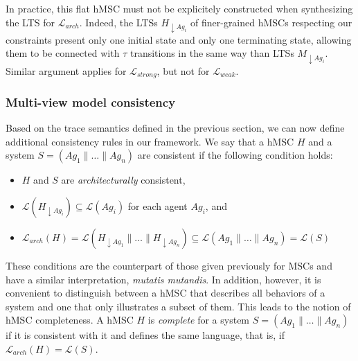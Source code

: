 In practice, this flat hMSC must not be explicitely constructed when synthesizing the LTS for $\mathcal{L}_{arch}$. Indeed, the LTSs $H_{\downarrow Ag_i}$ of finer-grained hMSCs respecting our constraints present only one initial state and only one terminating state, allowing them to be connected with $\tau$ transitions in the same way than LTSs $M_{\downarrow Ag_i}$. Similar argument applies for $\mathcal{L}_{strong}$, but not for $\mathcal{L}_{weak}$.

\subsubsection*{Multi-view model consistency}
 
Based on the trace semantics defined in the previous section, we can now define additional consistency rules in our framework. We say that a hMSC $H$ and a system $S = (Ag_1 \parallel \ldots \parallel Ag_n)$ are consistent if the following condition holds:

\begin{itemize}
\item $H$ and $S$ are \emph{architecturally} consistent,
\item $\mathcal{L}(H_{\downarrow Ag_i}) \subseteq \mathcal{L}(Ag_i)$ for each agent $Ag_i$, and
\item $\mathcal{L}_{arch}(H) = \mathcal{L}(H_{\downarrow Ag_1} \parallel \ldots \parallel H_{\downarrow Ag_n}) \subseteq \mathcal{L}(Ag_1 \parallel \ldots \parallel Ag_n) = \mathcal{L}(S)$
\end{itemize}

These conditions are the counterpart of those given previously for MSCs and have a similar interpretation, \emph{mutatis mutandis}. In addition, however, it is convenient to distinguish between a hMSC that describes all behaviors of a system and one that only illustrates a subset of them. This leads to the notion of hMSC completeness. A hMSC $H$ is \emph{complete} for a system $S = (Ag_1 \parallel \ldots \parallel Ag_n)$ if it is consistent with it and defines the same language, that is, if $\mathcal{L}_{arch}(H) = \mathcal{L}(S).$
